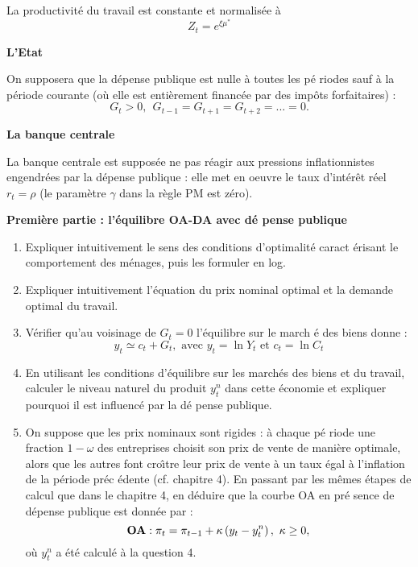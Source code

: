 \documentclass[a4paper,11pt]{article}
\begin{document}
La productivit\'{e} du travail est constante et normalis\'{e}e \`{a} 
\begin{equation*}
Z_{t}=e^{\xi \mu^{\ast}}
\end{equation*}


\noindent \textbf{L'Etat}

On supposera que la d\'{e}pense publique est nulle \`{a} toutes les p\'{e}%
riodes sauf \`{a} la p\'{e}riode courante (o\`{u} elle est enti\`{e}rement
financ\'{e}e par des imp\^{o}ts forfaitaires) :%
\begin{equation*}
G_{t}>0,\ \ G_{t-1}=G_{t+1}=G_{t+2}=...=0.
\end{equation*}

\noindent \textbf{La banque centrale}

La banque centrale est suppos\'{e}e ne pas r\'{e}agir aux pressions
inflationnistes engendr\'{e}es par la d\'{e}pense publique : elle met en
oeuvre le taux d'int\'{e}r\^{e}t r\'{e}el $r_{t}=\rho $ (le param\`{e}tre $\gamma$ dans la r\`{e}gle PM est z\'{e}ro).

\bigskip

\noindent \textbf{Premi\`{e}re partie : l'\'{e}quilibre OA-DA avec d\'{e}%
pense publique}

\begin{enumerate}
\item Expliquer intuitivement le sens des conditions d'optimalit\'{e} caract%
\'{e}risant le comportement des m\'{e}nages, puis les formuler en log.

\item  Expliquer intuitivement l'\'{e}quation du prix nominal optimal et la demande optimal du travail. 


\item V\'{e}rifier qu'au voisinage de $G_{t}=0$ l'\'{e}quilibre sur le march%
\'{e} des biens donne :%
\begin{equation*}
y_{t}\simeq c_{t}+G_{t},\text{ avec }y_{t}=\ln Y_{t}\text{ et }c_{t}=\ln
C_{t}
\end{equation*}

\item En utilisant les conditions d'\'{e}quilibre sur les march\'{e}s des
biens et du travail, calculer le niveau naturel du produit $y_{t}^{n}$ dans
cette \'{e}conomie et expliquer pourquoi il est influenc\'{e} par la d\'{e}%
pense publique.

\item On suppose que les prix nominaux sont rigides : \`{a} chaque p\'{e}%
riode une fraction $1-\omega $ des entreprises choisit son prix de vente de
mani\`{e}re optimale, alors que les autres font cro\^{\i}tre leur prix de
vente \`{a} un taux \'{e}gal \`{a} l'inflation de la p\'{e}riode pr\'{e}c%
\'{e}dente (cf. chapitre 4). En passant par les m\^{e}mes \'{e}tapes de
calcul que dans le chapitre 4, en d\'{e}duire que la courbe OA en pr\'{e}%
sence de d\'{e}pense publique est donn\'{e}e par :%
\begin{equation*}
\text{\textbf{OA}}:\pi _{t}=\pi _{t-1}+\kappa \left( y_{t}-y_{t}^{n}\right)
,\ \kappa \geq 0,
\end{equation*}%
o\`{u} $y_{t}^{n}$ a \'{e}t\'{e} calcul\'{e} \`{a} la question 4.
\end{enumerate}
\end{document}
